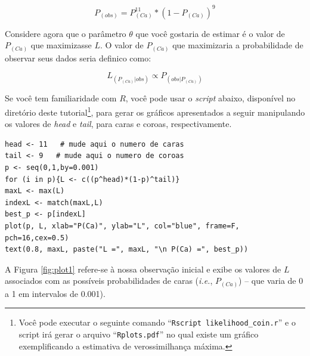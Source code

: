 \begin{refsection}
\begin{equation} \label{eq:prob3}
P_{(obs)} = P_{(Ca)}^{11}*(1-P_{(Ca)})^9
\end{equation}


Considere agora que o parâmetro $\theta$ que você gostaria de estimar é o valor de $P_{(Ca)}$ que maximizasse $L$. O valor de $P_{(Ca)}$ que maximizaria a probabilidade de observar seus dados seria definico como: 

\begin{equation} \label{eq:ml2}
L_{(P_{(Ca)} | obs)} \propto P_{(obs | P_{(Ca)})}
\end{equation}

Se você tem familiaridade com $R$, você pode usar o \textit{script} abaixo, disponível no diretório deste tutorial\footnote{ Você pode executar o seguinte comando ``\texttt{Rscript likelihood\_coin.r}'' e o script irá gerar o arquivo ``\texttt{Rplots.pdf}'' no qual existe um gráfico exemplificando a estimativa de verossimilhança máxima.}, para gerar os gráficos apresentados a seguir manipulando os valores de \textit{head} e \textit{tail}, para caras e coroas, respectivamente.

\begin{lstlisting}[label=tut3:ls1]
head <- 11   # mude aqui o numero de caras
tail <- 9   # mude aqui o numero de coroas
p <- seq(0,1,by=0.001)
for (i in p){L <- c((p^head)*(1-p)^tail)}
maxL <- max(L)
indexL <- match(maxL,L)
best_p <- p[indexL]
plot(p, L, xlab="P(Ca)", ylab="L", col="blue", frame=F, pch=16,cex=0.5)
text(0.8, maxL, paste("L =", maxL, "\n P(Ca) =", best_p))
\end{lstlisting}

A Figura \ref{fig:plot1} refere-se à nossa observação inicial e exibe os valores de $L$ associados com as possíveis probabilidades de caras (\textit{i.e.}, $P_{(Ca)}$) -- que varia de 0 a 1 em intervalos de 0.001).



\end{refsection}
